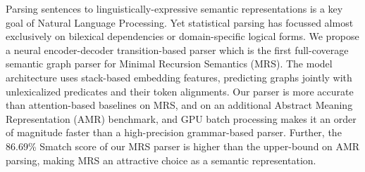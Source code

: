 Parsing sentences to linguistically-expressive semantic representations is a key goal of Natural Language Processing. Yet statistical parsing has focussed almost exclusively on bilexical dependencies or domain-specific logical forms. We propose a neural encoder-decoder transition-based parser which is the first full-coverage semantic graph parser for Minimal Recursion Semantics (MRS). The model architecture uses stack-based embedding features, predicting graphs jointly with unlexicalized predicates and their token alignments. Our parser is more accurate than attention-based baselines on MRS, and on an additional Abstract Meaning Representation (AMR) benchmark, and GPU batch processing makes it an order of magnitude faster than a high-precision grammar-based parser. Further, the 86.69\% Smatch score of our MRS parser is higher than the upper-bound on AMR parsing, making MRS an attractive choice as a semantic representation.
